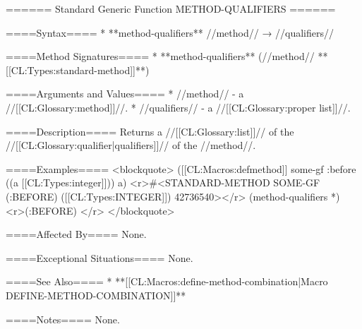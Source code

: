 ====== Standard Generic Function METHOD-QUALIFIERS ======

====Syntax====
  * **method-qualifiers** //method// → //qualifiers//

====Method Signatures====
  * **method-qualifiers** (//method// **[[CL:Types:standard-method]]**)

====Arguments and Values====
  * //method// - a //[[CL:Glossary:method]]//.
  * //qualifiers// - a //[[CL:Glossary:proper list]]//.

====Description====
Returns a //[[CL:Glossary:list]]// of the //[[CL:Glossary:qualifier|qualifiers]]// of the //method//.

====Examples====
<blockquote>
([[CL:Macros:defmethod]] some-gf :before ((a [[CL:Types:integer]])) a) <r>#<STANDARD-METHOD SOME-GF (:BEFORE) ([[CL:Types:INTEGER]]) 42736540></r>
(method-qualifiers *) <r>(:BEFORE) </r>
</blockquote>

====Affected By====
None.

====Exceptional Situations====
None.

====See Also====
  * **[[CL:Macros:define-method-combination|Macro DEFINE-METHOD-COMBINATION]]**

====Notes====
None.

